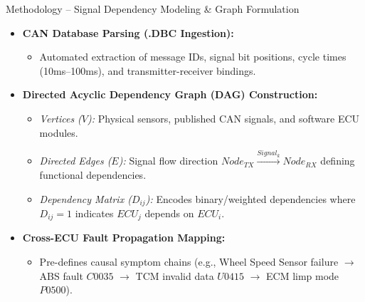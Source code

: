 \documentclass[aspectratio=169, 10pt]{beamer}
\begin{document}
\begin{frame}{Methodology -- Signal Dependency Modeling \& Graph Formulation}
  \begin{itemize}
    \item \textbf{CAN Database Parsing (.DBC Ingestion):}
    \begin{itemize}
      \item Automated extraction of message IDs, signal bit positions, cycle times (10ms--100ms), and transmitter-receiver bindings.
    \end{itemize}
    \item \textbf{Directed Acyclic Dependency Graph (DAG) Construction:}
    \begin{itemize}
      \item \textit{Vertices ($V$):} Physical sensors, published CAN signals, and software ECU modules.
      \item \textit{Directed Edges ($E$):} Signal flow direction $Node_{TX} \xrightarrow{Signal_k} Node_{RX}$ defining functional dependencies.
      \item \textit{Dependency Matrix ($D_{ij}$):} Encodes binary/weighted dependencies where $D_{ij} = 1$ indicates $ECU_j$ depends on $ECU_i$.
    \end{itemize}
    \item \textbf{Cross-ECU Fault Propagation Mapping:}
    \begin{itemize}
      \item Pre-defines causal symptom chains (e.g., Wheel Speed Sensor failure $\rightarrow$ ABS fault $C0035$ $\rightarrow$ TCM invalid data $U0415$ $\rightarrow$ ECM limp mode $P0500$).
    \end{itemize}
  \end{itemize}
\end{frame}
\end{document}
